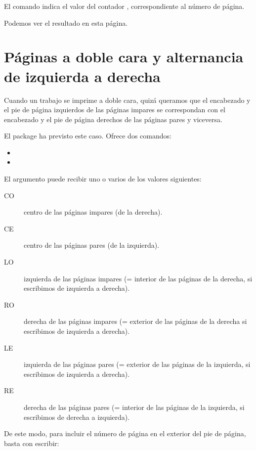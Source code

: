 El comando  indica el valor del contador , correspondiente al número de página.

Podemos ver el resultado en esta página.
\cfoot{{\thepage} / \ref{TotPages}\cfoot{\thepage}} 

\section{Páginas a doble cara y alternancia de izquierda a derecha}

Cuando un trabajo se imprime a doble cara, quizá queramos que el encabezado y el pie de página izquierdos de las páginas impares se correspondan con el encabezado y el pie de página derechos de las páginas pares y viceversa.

El package  ha previsto este caso. Ofrece dos comandos: 
\begin{itemize}
\item {}
\item {}
\end{itemize}

El argumento  puede recibir uno o varios de los valores siguientes:
\begin{description}
\item[CO] centro de las páginas impares (de la derecha).
\item[CE] centro de las páginas pares (de la izquierda).
\item[LO] izquierda de las páginas impares (= interior de las páginas de la derecha, si escribimos de izquierda a derecha).
\item[RO] derecha de las páginas impares (= exterior de las páginas de la derecha si escribimos de izquierda a derecha).
\item[LE] izquierda de las páginas pares (= exterior de las páginas de la izquierda, si escribimos de izquierda a derecha).
\item[RE] derecha de las páginas pares (= interior de las páginas de la izquierda, si escribimos de derecha a izquierda).
\end{description}

De este modo, para incluir el número de página en el exterior del pie de página, basta con escribir:

\begin{latexcode}
\fancyfoot[LE,RO]{\thepage}
\end{latexcode}

